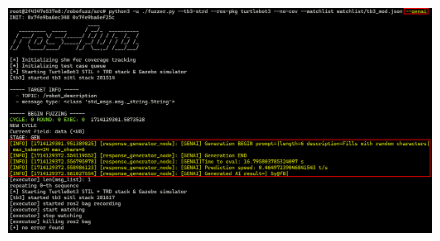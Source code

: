 

\begin{figure}[ht!]
    \centering
    \includegraphics[width=1.0\textwidth]{./figures/data/robofuzz_genai_01A_RESALTADO_fase1_arranque+semilla_random.png}
    \label{fig:robofuzz_genai_01A_RESALTADO_fase1_arranque+semilla_random}
\end{figure}